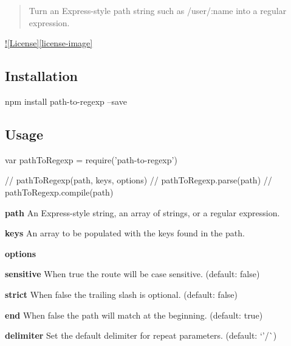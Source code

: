 \begin{quote}
Turn an Express-\/style path string such as {\ttfamily /user/\+:name} into a regular expression. \end{quote}


\href{https://npmjs.org/package/path-to-regexp}{\tt } \href{https://travis-ci.org/pillarjs/path-to-regexp}{\tt } \href{https://coveralls.io/r/pillarjs/path-to-regexp?branch=master}{\tt } \href{https://david-dm.org/pillarjs/path-to-regexp}{\tt } \mbox{\hyperlink{worker-farm_2_l_i_c_e_n_s_e_8md}{!\mbox{[}License\mbox{]}\mbox{[}license-\/image\mbox{]}}} \href{https://npmjs.org/package/path-to-regexp}{\tt }

\subsection*{Installation}


\begin{DoxyCode}
npm install path-to-regexp --save
\end{DoxyCode}


\subsection*{Usage}


\begin{DoxyCode}
var pathToRegexp = require('path-to-regexp')

// pathToRegexp(path, keys, options)
// pathToRegexp.parse(path)
// pathToRegexp.compile(path)
\end{DoxyCode}



\begin{DoxyItemize}
\item {\bfseries path} An Express-\/style string, an array of strings, or a regular expression.
\item {\bfseries keys} An array to be populated with the keys found in the path.
\item {\bfseries options}
\begin{DoxyItemize}
\item {\bfseries sensitive} When {\ttfamily true} the route will be case sensitive. (default\+: {\ttfamily false})
\item {\bfseries strict} When {\ttfamily false} the trailing slash is optional. (default\+: {\ttfamily false})
\item {\bfseries end} When {\ttfamily false} the path will match at the beginning. (default\+: {\ttfamily true})
\item {\bfseries delimiter} Set the default delimiter for repeat parameters. (default\+: `'/\textquotesingle{}\`{})
\end{DoxyItemize}
\end{DoxyItemize}


